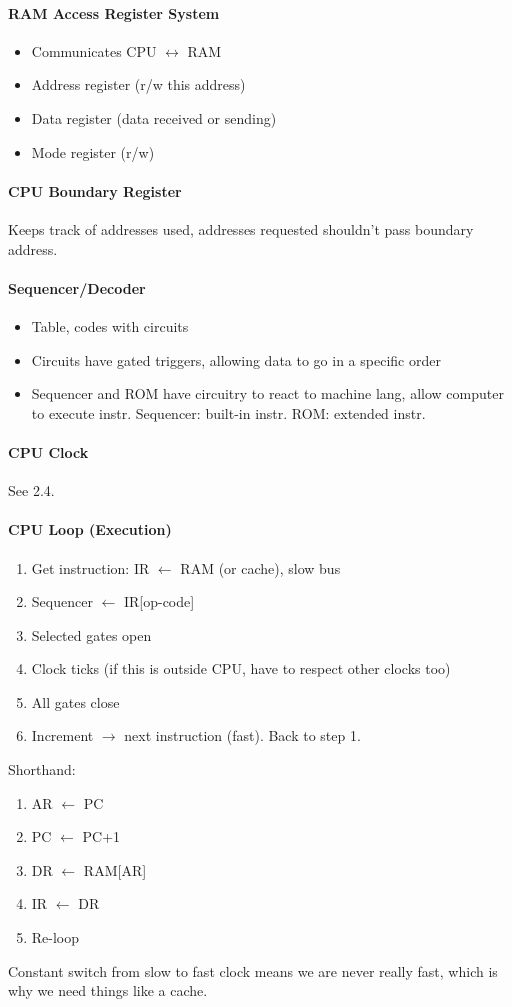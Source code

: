 \documentclass[12 pt]{article}
\begin{document}
	\paragraph{RAM Access Register System}
	\begin{itemize}
		\item Communicates CPU $\leftrightarrow$ RAM
		\item Address register (r/w this address)
		\item Data register (data received or sending)
		\item Mode register (r/w)
	\end{itemize}
	\paragraph{CPU Boundary Register} Keeps track of addresses used, addresses requested shouldn't pass boundary address.
	\paragraph{Sequencer/Decoder}
	\begin{itemize}
		\item Table, codes with circuits
		\item Circuits have gated triggers, allowing data to go in a specific order
		\item Sequencer and ROM have circuitry to react to machine lang, allow computer to execute instr. Sequencer: built-in instr. ROM: extended instr.
	\end{itemize}
	\paragraph{CPU Clock}
	See 2.4.
	\paragraph{CPU Loop (Execution)}
	\begin{enumerate}
		\item Get instruction: IR $\gets$ RAM (or cache), slow bus
		\item Sequencer $\gets$ IR[op-code]
		\item Selected gates open
		\item Clock ticks (if this is outside CPU, have to respect other clocks too)
		\item All gates close
		\item Increment  $\to$ next instruction (fast). Back to step 1.
	\end{enumerate}
	Shorthand: 
	\begin{enumerate}
		\item AR $\gets$ PC
		\item PC $\gets$ PC+1
		\item DR $\gets$ RAM[AR]
		\item IR $\gets$ DR
		\item Re-loop
	\end{enumerate}
	Constant switch from slow to fast clock means we are never really fast, which is why we need things like a cache.
\end{document}
